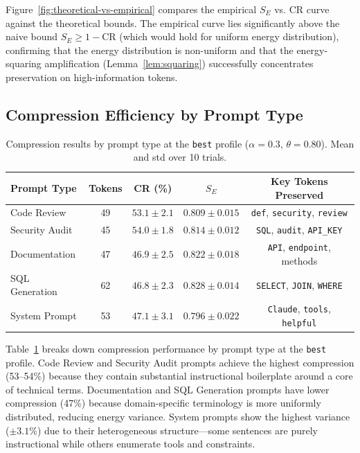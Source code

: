 \documentclass[11pt]{article}
\theoremstyle{remark}
\begin{document}
Figure~\ref{fig:theoretical-vs-empirical} compares the empirical $S_E$ vs.
CR curve against the theoretical bounds. The empirical curve lies
significantly above the naive bound $S_E \geq 1 - \text{CR}$ (which would
hold for uniform energy distribution), confirming that the energy
distribution is non-uniform and that the energy-squaring amplification
(Lemma~\ref{lem:squaring}) successfully concentrates preservation on
high-information tokens.

\subsection{Compression Efficiency by Prompt Type}

\begin{table}[H]
\centering
\caption{Compression results by prompt type at the \texttt{best} profile
($\alpha = 0.3$, $\theta = 0.80$). Mean and std over 10 trials.}
\label{tab:by-prompt-type}
\small
\begin{tabular}{lcccc}
\toprule
Prompt Type & Tokens & CR (\%) & $S_E$ & Key Tokens Preserved \\
\midrule
Code Review       & 49  & $53.1 \pm 2.1$ & $0.809 \pm 0.015$ & \texttt{def}, \texttt{security}, \texttt{review} \\
Security Audit    & 45  & $54.0 \pm 1.8$ & $0.814 \pm 0.012$ & \texttt{SQL}, \texttt{audit}, \texttt{API\_KEY} \\
Documentation     & 47  & $46.9 \pm 2.5$ & $0.822 \pm 0.018$ & \texttt{API}, \texttt{endpoint}, methods \\
SQL Generation    & 62  & $46.8 \pm 2.3$ & $0.828 \pm 0.014$ & \texttt{SELECT}, \texttt{JOIN}, \texttt{WHERE} \\
System Prompt     & 53  & $47.1 \pm 3.1$ & $0.796 \pm 0.022$ & \texttt{Claude}, \texttt{tools}, \texttt{helpful} \\
\bottomrule
\end{tabular}
\end{table}

Table~\ref{tab:by-prompt-type} breaks down compression performance by prompt
type at the \texttt{best} profile. Code Review and Security Audit prompts
achieve the highest compression (53--54\%) because they contain substantial
instructional boilerplate around a core of technical terms. Documentation
and SQL Generation prompts have lower compression (47\%) because
domain-specific terminology is more uniformly distributed, reducing energy
variance. System prompts show the highest variance ($\pm 3.1\%$) due to
their heterogeneous structure---some sentences are purely instructional
while others enumerate tools and constraints.
\end{document}
